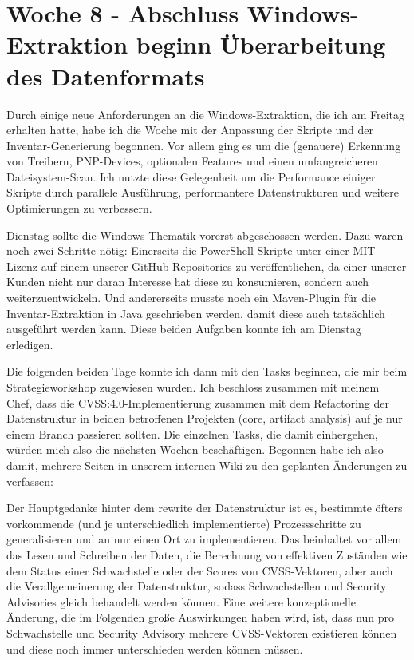 \section{Woche 8 - Abschluss Windows-Extraktion \headerand beginn Überarbeitung des Datenformats} \label{sec:bericht-wo-8}



Durch einige neue Anforderungen an die Windows-Extraktion, die ich am Freitag erhalten hatte, habe ich die Woche mit der Anpassung der Skripte und der Inventar-Generierung begonnen.
Vor allem ging es um die (genauere) Erkennung von Treibern, PNP-Devices, optionalen Features und einen umfangreicheren Dateisystem-Scan.
Ich nutzte diese Gelegenheit um die Performance einiger Skripte durch parallele Ausführung, performantere Datenstrukturen und weitere Optimierungen zu verbessern.


Dienstag sollte die Windows-Thematik vorerst abgeschossen werden.
Dazu waren noch zwei Schritte nötig:
Einerseits die PowerShell-Skripte unter einer MIT-Lizenz auf einem unserer GitHub Repositories zu veröffentlichen, da einer unserer Kunden nicht nur daran Interesse hat diese zu konsumieren, sondern auch weiterzuentwickeln.
Und andererseits musste noch ein Maven-Plugin für die Inventar-Extraktion in Java geschrieben werden, damit diese auch tatsächlich ausgeführt werden kann.
Diese beiden Aufgaben konnte ich am Dienstag erledigen.


Die folgenden beiden Tage konnte ich dann mit den Tasks beginnen, die mir beim Strategieworkshop zugewiesen wurden.
Ich beschloss zusammen mit meinem Chef, dass die CVSS:4.0-Implementierung zusammen mit dem Refactoring der Datenstruktur in beiden betroffenen Projekten (core, artifact analysis) auf je nur einem Branch passieren sollten.
Die einzelnen Tasks, die damit einhergehen, würden mich also die nächsten Wochen beschäftigen.
Begonnen habe ich also damit, mehrere Seiten in unserem internen Wiki zu den geplanten Änderungen zu verfassen:

Der Hauptgedanke hinter dem rewrite der Datenstruktur ist es, bestimmte öfters vorkommende (und je unterschiedlich implementierte) Prozessschritte zu generalisieren und an nur einen Ort zu implementieren.
Das beinhaltet vor allem das Lesen und Schreiben der Daten, die Berechnung von effektiven Zuständen wie dem Status einer Schwachstelle oder der Scores von CVSS-Vektoren, aber auch die Verallgemeinerung der Datenstruktur, sodass Schwachstellen und Security Advisories gleich behandelt werden können.
Eine weitere konzeptionelle Änderung, die im Folgenden große Auswirkungen haben wird, ist, dass nun pro Schwachstelle und Security Advisory mehrere CVSS-Vektoren existieren können und diese noch immer unterschieden werden können müssen.

